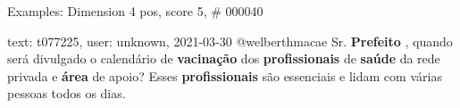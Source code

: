 \begin{frame}{Examples: Dimension 4 pos, score 5, \# 000040}
\footnotesize
\begin{exampleblock}{text: t077225, user: unknown, 2021-03-30}
@welberthmacae Sr. \textbf{Prefeito} , quando será divulgado o calendário de 
\textbf{vacinação} dos \textbf{profissionais} de \textbf{saúde} da rede privada 
e \textbf{área} de apoio? Esses \textbf{profissionais} são essenciais e lidam 
com várias pessoas todos os dias. 
\end{exampleblock}
\end{frame}
